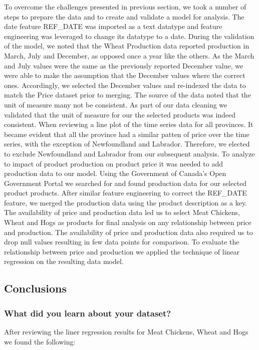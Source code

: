To overcome the challenges presented in previous section, we took a number of steps to prepare the data and to create and validate a model for analysis.  
The date feature REF\_DATE was imported as a text datatype and feature engineering was leveraged to change its datatype to a date.
During the validation of the model, we noted that the Wheat Production data reported production in March, July and December, as opposed once a year like the others.
As the March and July values were the same as the previously reported December value, we were able to make the assumption that the December values where the correct ones.
Accordingly, we selected the December values and re-indexed the data to match the Price dataset prior to merging.
The source of the data noted that the unit of measure many not be consistent. As part of our data cleaning we validated that the unit of measure for our the selected products was indeed consistent.
When reviewing a line plot of the time series data for all provinces.
It became evident that all the province had a similar patten of price over the time series, with the exception of Newfoundland and Labrador.
Therefore, we elected to exclude Newfoundland and Labrador from our subsequent analysis.
To analyze to impact of product production on product price it was needed to add production data to our model.
Using the Government of Canada's Open Government Portal we searched for and found production data for our selected product products.
After similar feature engineering to correct the REF\_DATE feature, we merged the production data using the product description as a key.
The availability of price and production data led us to select Meat Chickens, Wheat and Hogs as products for final analysis on any relationship between price and production.
The availability of price and production data also required us to drop null values resulting in few data points for comparison.
To evaluate the relationship between price and production we applied the technique of linear regression on the resulting data model.

\subsection{Conclusions}

\subsubsection{What did you learn about your dataset?}

After reviewing the liner regression results for Meat Chickens, Wheat and Hogs we found the following:

